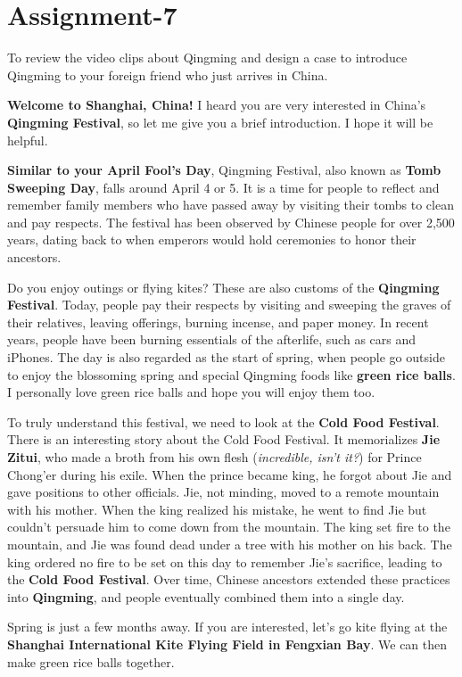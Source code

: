 \section{Assignment-7}

\begin{question}
    To review the video clips about Qingming and design a case to introduce Qingming to your foreign friend who just arrives in China.
\end{question}

\textbf{Welcome to Shanghai, China!} I heard you are very interested in China's \textbf{Qingming Festival}, so let me give you a brief introduction. I hope it will be helpful.

\textbf{Similar to your April Fool's Day}, Qingming Festival, also known as \textbf{Tomb Sweeping Day}, falls around April 4 or 5. It is a time for people to reflect and remember family members who have passed away by visiting their tombs to clean and pay respects. The festival has been observed by Chinese people for over 2,500 years, dating back to when emperors would hold ceremonies to honor their ancestors.

Do you enjoy outings or flying kites? These are also customs of the \textbf{Qingming Festival}. Today, people pay their respects by visiting and sweeping the graves of their relatives, leaving offerings, burning incense, and paper money. In recent years, people have been burning essentials of the afterlife, such as cars and iPhones. The day is also regarded as the start of spring, when people go outside to enjoy the blossoming spring and special Qingming foods like \textbf{green rice balls}. I personally love green rice balls and hope you will enjoy them too.

To truly understand this festival, we need to look at the \textbf{Cold Food Festival}. There is an interesting story about the Cold Food Festival. It memorializes \textbf{Jie Zitui}, who made a broth from his own flesh (\textit{incredible, isn't it?}) for Prince Chong'er during his exile. When the prince became king, he forgot about Jie and gave positions to other officials. Jie, not minding, moved to a remote mountain with his mother. When the king realized his mistake, he went to find Jie but couldn't persuade him to come down from the mountain. The king set fire to the mountain, and Jie was found dead under a tree with his mother on his back. The king ordered no fire to be set on this day to remember Jie's sacrifice, leading to the \textbf{Cold Food Festival}. Over time, Chinese ancestors extended these practices into \textbf{Qingming}, and people eventually combined them into a single day.

Spring is just a few months away. If you are interested, let's go kite flying at the \textbf{Shanghai International Kite Flying Field in Fengxian Bay}. We can then make green rice balls together.